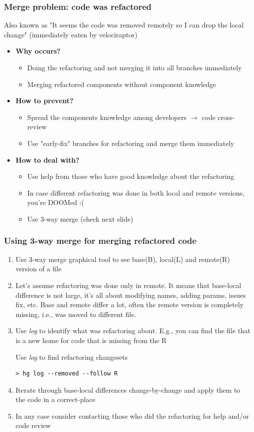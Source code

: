 \documentclass{beamer}
\begin{document}
\begin{frame}
\frametitle{Merge problem: code was refactored}
Also known as "It seems the code was removed remotely so I can drop the local change" (immediately eaten by velociraptor)


\begin{itemize}
\item \textbf{Why occurs?}
\begin{itemize}
\item Doing the refactoring and not merging it into all branches immediately
\item Merging refactored components without component knowledge
\end{itemize}
\item \textbf{How to prevent?}
\begin{itemize}
\item Spread the components knowledge among developers $\to$ code cross-review
\item Use "early-fix" branches for refactoring and merge them immediately
\end{itemize}
\item \textbf{How to deal with?}
\begin{itemize}
\item Use help from those who have good knowledge about the refactoring
\item In case different refactoring was done in both local and remote versions, you're DOOMed :(
\item Use 3-way merge (check next slide)
\end{itemize}
\end{itemize}
\end{frame}

\begin{frame}[fragile]
\frametitle{Using 3-way merge for merging refactored code}
\begin{enumerate}
\item Use 3-way merge graphical tool to see base(B), local(L) and remote(R) version of a file
\item Let's assume refactoring was done only in remote. It means that base-local difference is not large, it's all about modifying names, adding params, issues fix, etc. Base and remote differ a lot, often the remote version is completely missing, i.e., was moved to different file.
\item Use \textit{log} to identify what was refactoring about. E.g., you can find the file that is a new home for code that is missing from the R
\begin{exampleblock}{Use \textit{log} to find refactoring changesets}
\begin{verbatim}
> hg log --removed --follow R 
\end{verbatim}
\end{exampleblock}
\item Iterate through base-local differences change-by-change and apply them to the code in a correct-place
\item In any case consider contacting those who did the refactoring for help and/or code review
\end{enumerate}
\end{frame}
\end{document}
